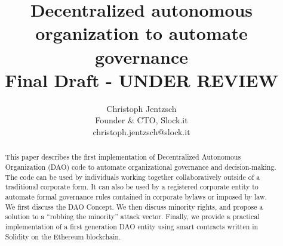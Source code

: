 \documentclass[9pt,oneside]{amsart}
\title{Decentralized autonomous organization to automate governance\\ {\smaller \textbf{Final Draft - UNDER REVIEW}}}
\author{
    Christoph Jentzsch\\
    Founder \& CTO, Slock.it\\
    christoph.jentzsch@slock.it
}
\begin{document}
\begin{abstract}
This paper describes the first implementation of Decentralized Autonomous Organization (DAO) code to automate organizational governance and decision-making. The code can be used by individuals working together collaboratively outside of a traditional corporate form. It can also be used by a registered corporate entity to automate formal governance rules contained in corporate bylaws or imposed by law. We first discuss the DAO Concept. We then discuss minority rights, and propose a solution to a ``robbing the minority'' attack vector. Finally, we provide a practical implementation of a first generation DAO entity using smart contracts written in Solidity on the Ethereum blockchain.
\end{abstract}

\maketitle
\end{document}
